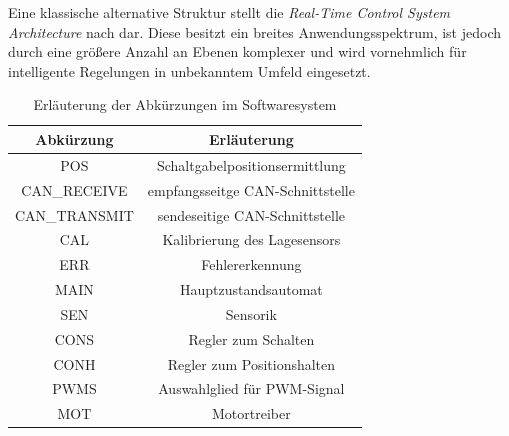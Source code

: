 Eine klassische alternative Struktur stellt die \textit{Real-Time Control System Architecture} nach \cite{albus} dar. Diese besitzt ein breites Anwendungsspektrum, ist jedoch durch eine größere Anzahl an Ebenen komplexer und wird vornehmlich für intelligente Regelungen in unbekanntem Umfeld eingesetzt. \cite{albus}
\begin{table}%
\centering
\begin{tabular}{c c}
\hline
Abkürzung & Erläuterung \\
\hline
POS & Schaltgabelpositionsermittlung\\
CAN\_RECEIVE & empfangsseitge CAN-Schnittstelle \\
CAN\_TRANSMIT & sendeseitige CAN-Schnittstelle \\
CAL & Kalibrierung des Lagesensors\\
ERR & Fehlererkennung\\
MAIN & Hauptzustandsautomat\\
SEN & Sensorik\\
CONS & Regler zum Schalten\\
CONH & Regler zum Positionshalten\\
PWMS & Auswahlglied für PWM-Signal\\
MOT & Motortreiber \\

\end{tabular}
\caption{Erläuterung der Abkürzungen im Softwaresystem}
\label{tab_kurz}
\end{table} 

